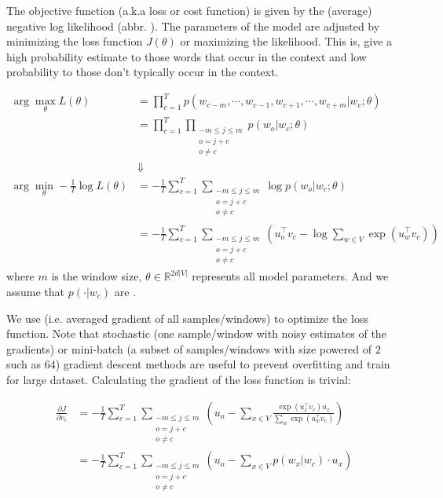 \MoveNextFigure{+5cm}


The objective function (a.k.a loss or cost function) is given by the (average) negative log likelihood (abbr. ).
The parameters of the model are adjusted by minimizing the loss function $J(\theta)$ or maximizing the likelihood.
This is, give a high probability estimate to those words that occur in the context and low probability to those don't typically occur in the context.


\begin{align}
	\arg\max_\theta L(\theta) &= \prod_{c=1}^{T} p(w_{c-m}, \cdots, w_{c-1}, w_{c+1}, \cdots, w_{c+m} | w_c; \theta) \nonumber \\
	&= \prod_{c=1}^{T} \prod_{\substack{-m \le j \le m \\ o = j + c \\ o \ne c}} p(w_o | w_c; \theta) \nonumber \\
	&\Downarrow \nonumber \\
	\arg\min_\theta -\frac{1}{T} \log L(\theta) &= -\frac{1}{T} \sum_{c=1}^{T} \sum_{ \substack{-m \le j \le m \\ o=j+c \\ o \ne c}} \log p(w_o | w_c; \theta) \nonumber \\
	&= -\frac{1}{T} \sum_{c=1}^{T} \sum_{ \substack{-m \le j \le m \\ o=j+c \\ o \ne c}} \left( u_o^\top v_c - \log \sum_{w \in V} \exp(u_w^\top v_c)\right) 
	\label{eq:word2vec_loss}
\end{align}
where $m$ is the window size, $\theta \in \mathbb{R}^{2d|V|}$ represents all model parameters.
And we assume that $p(\cdot | w_c)$ are .


We use  (i.e. averaged gradient of all samples/windows) to optimize the loss function.
Note that stochastic (one sample/window with noisy estimates of the gradients) or mini-batch (a subset of samples/windows with size powered of $2$ such as $64$) gradient descent methods are useful to prevent overfitting and train for large dataset.
Calculating the gradient of the loss function is trivial:

\begin{equation}
\begin{split}
\frac{\partial J}{\partial v_c} &= -\frac{1}{T} \sum_{c=1}^{T} \sum_{ \substack{-m \le j \le m \\ o=j+c \\ o \ne c}} \left(u_o - \sum_{x \in V} \frac{\exp(u_x^\top v_c) u_x}{\sum_w \exp(u_w^\top v_c)}\right) \\
&= -\frac{1}{T} \sum_{c=1}^{T} \sum_{ \substack{-m \le j \le m \\ o=j+c \\ o \ne c}} \left(u_o - \sum_{x \in V} p(w_x | w_c) \cdot u_x \right)
\end{split}
\end{equation}

